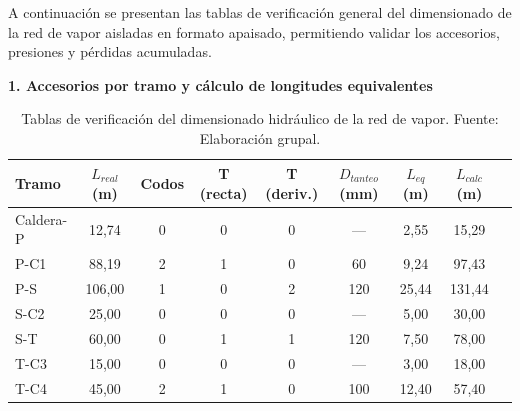 \documentclass[12pt]{article}
\begin{document}
A continuación se presentan las tablas de verificación general del dimensionado de la red de vapor aisladas en formato apaisado, permitiendo validar los accesorios, presiones y pérdidas acumuladas.

\begin{landscape}
	\begin{table}[H]
		\centering
		\small
		\caption{Tablas de verificación del dimensionado hidráulico de la red de vapor. Fuente: Elaboración grupal.}
		\label{tab:verificacion-red-vapor-completa}

		\begin{minipage}{\linewidth}
			\centering
			\textbf{1. Accesorios por tramo y cálculo de longitudes equivalentes}
			\vspace{0.2cm}
			\begin{tabular}{lcccccccc}
				\toprule
				\textbf{Tramo} & \textbf{$L_{real}$ (m)} & \textbf{Codos} & \textbf{T (recta)} & \textbf{T (deriv.)} & \textbf{$D_{tanteo}$ (mm)} & \textbf{$L_{eq}$ (m)} & \textbf{$L_{calc}$ (m)} \\
				\midrule
				Caldera-P      & 12,74                   & 0              & 0                  & 0                   & ---                        & 2,55                  & 15,29                   \\
				P-C1           & 88,19                   & 2              & 1                  & 0                   & 60                         & 9,24                  & 97,43                   \\
				P-S            & 106,00                  & 1              & 0                  & 2                   & 120                        & 25,44                 & 131,44                  \\
				S-C2        & 25,00                   & 0              & 0                  & 0                   & ---                        & 5,00                  & 30,00                   \\
				S-T            & 60,00                   & 0              & 1                  & 1                   & 120                        & 7,50                  & 78,00                   \\
				T-C3        & 15,00                   & 0              & 0                  & 0                   & ---                        & 3,00                  & 18,00                   \\
				T-C4        & 45,00                   & 2              & 1                  & 0                   & 100                        & 12,40                 & 57,40                   \\
				\bottomrule
			\end{tabular}
		\end{minipage}


\end{table}
\end{landscape}
\end{document}
